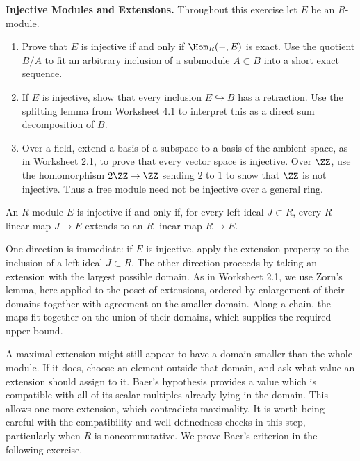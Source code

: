 \documentclass[12pt,reqno]{amsart}
\begin{document}
\hrulefill

\begin{problems}
\item\label{h:injective} \textbf{Injective Modules and Extensions.} Throughout this exercise let $E$ be an $R$-module.
\begin{enumerate}
\item Prove that $E$ is injective if and only if $\Hom_R(-,E)$ is exact. Use the quotient $B/A$ to fit an arbitrary inclusion of a submodule $A\subset B$ into a short exact sequence.
\item If $E$ is injective, show that every inclusion $E\hookrightarrow B$ has a retraction. Use the splitting lemma from Worksheet 4.1 to interpret this as a direct sum decomposition of $B$.
\item Over a field, extend a basis of a subspace to a basis of the ambient space, as in Worksheet 2.1, to prove that every vector space is injective. Over $\ZZ$, use the homomorphism $2\ZZ\to\ZZ$ sending $2$ to $1$ to show that $\ZZ$ is not injective. Thus a free module need not be injective over a general ring.
\end{enumerate}
\end{problems}

\hrulefill

\begin{theorem}
An $R$-module $E$ is injective if and only if, for every left ideal $J\subset R$, every $R$-linear map $J\to E$ extends to an $R$-linear map $R\to E$.
\end{theorem}

One direction is immediate: if $E$ is injective, apply the extension property to the inclusion of a left ideal $J\subset R$. The other direction proceeds by taking an extension with the largest possible domain. As in Worksheet 2.1, we use Zorn's lemma, here applied to the poset of extensions, ordered by enlargement of their domains together with agreement on the smaller domain. Along a chain, the maps fit together on the union of their domains, which supplies the required upper bound.

A maximal extension might still appear to have a domain smaller than the whole module. If it does, choose an element outside that domain, and ask what value an extension should assign to it. Baer's hypothesis provides a value which is compatible with all of its scalar multiples already lying in the domain. This allows one more extension, which contradicts maximality. It is worth being careful with the compatibility and well-definedness checks in this step, particularly when $R$ is noncommutative. We prove Baer's criterion in the following exercise.
\end{document}
